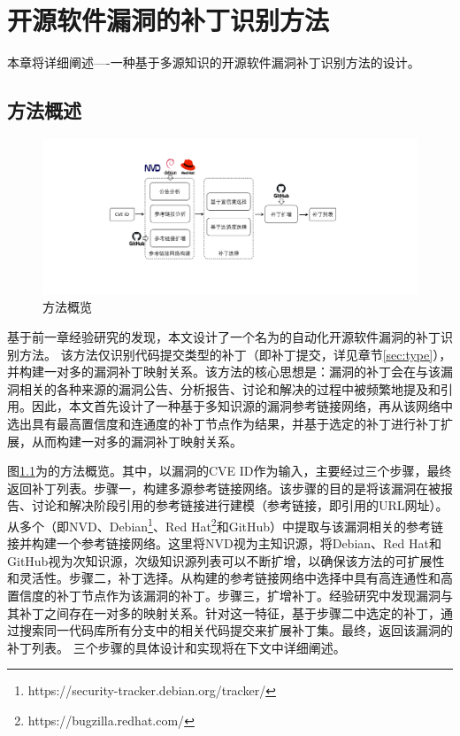 
\chapter{开源软件漏洞的补丁识别方法}

本章将详细阐述\tool ----一种基于多源知识的开源软件漏洞补丁识别方法的设计。

\section{方法概述}
\begin{figure}[t]
    \centering
    \includegraphics[scale=0.5]{fig/overview.pdf}
    \caption{\tool 方法概览}\label{fig:overview}
\end{figure}

基于前一章经验研究的发现，本文设计了一个名为\tool 的自动化开源软件漏洞的补丁识别方法。
该方法仅识别代码提交类型的补丁（即补丁提交，详见章节\ref{sec:type}），并构建一对多的漏洞补丁映射关系。该方法的核心思想是：漏洞的补丁会在与该漏洞相关的各种来源的漏洞公告、分析报告、讨论和解决的过程中被频繁地提及和引用。因此，本文首先设计了一种基于多知识源的漏洞参考链接网络，再从该网络中选出具有最高置信度和连通度的补丁节点作为结果，并基于选定的补丁进行补丁扩展，从而构建一对多的漏洞补丁映射关系。

图\ref{fig:overview}为\tool 的方法概览。其中，\tool 以漏洞的CVE ID作为输入，主要经过三个步骤，最终返回补丁列表。步骤一，构建多源参考链接网络。该步骤的目的是将该漏洞在被报告、讨论和解决阶段引用的参考链接进行建模（参考链接，即引用的URL网址）。\tool 从多个（即NVD、Debian\footnote{https://security-tracker.debian.org/tracker/}、Red Hat\footnote{https://bugzilla.redhat.com/}和GitHub）中提取与该漏洞相关的参考链接并构建一个参考链接网络。这里将NVD视为主知识源，将Debian、Red Hat和GitHub视为次知识源，次级知识源列表可以不断扩增，以确保该方法的可扩展性和灵活性。步骤二，补丁选择。\tool 从构建的参考链接网络中选择中具有高连通性和高置信度的补丁节点作为该漏洞的补丁。步骤三，扩增补丁。经验研究中发现漏洞与其补丁之间存在一对多的映射关系。针对这一特征，基于步骤二中选定的补丁，\tool 通过搜索同一代码库所有分支中的相关代码提交来扩展补丁集。最终，\tool 返回该漏洞的补丁列表。
三个步骤的具体设计和实现将在下文中详细阐述。

